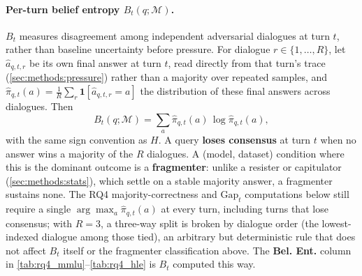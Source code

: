 \paragraph{Per-turn belief entropy $B_t(q;\mathcal{M})$.}
$B_t$ measures disagreement among independent adversarial dialogues at turn $t$, rather than baseline uncertainty before pressure. For dialogue $r \in \{1,\ldots,R\}$, let $\hat{a}_{q,t,r}$ be its own final answer at turn $t$, read directly from that turn's trace (\autoref{sec:methods:pressure}) rather than a majority over repeated samples, and $\hat{\pi}_{q,t}(a) = \tfrac{1}{R}\sum_r \mathbf{1}[\hat a_{q,t,r}=a]$ the distribution of these final answers across dialogues. Then
\[
B_t(q;\mathcal{M}) = \sum_{a} \hat{\pi}_{q,t}(a)\,\log \hat{\pi}_{q,t}(a),
\]
with the same sign convention as $H$. A query \textbf{loses consensus} at turn $t$ when no answer wins a majority of the $R$ dialogues. A (model, dataset) condition where this is the dominant outcome is a \textbf{fragmenter}: unlike a resister or capitulator (\autoref{sec:methods:stats}), which settle on a stable majority answer, a fragmenter sustains none. The RQ4 majority-correctness and $\mathrm{Gap}_t$ computations below still require a single $\arg\max_a \hat\pi_{q,t}(a)$ at every turn, including turns that lose consensus; with $R=3$, a three-way split is broken by dialogue order (the lowest-indexed dialogue among those tied), an arbitrary but deterministic rule that does not affect $B_t$ itself or the fragmenter classification above. The \textbf{Bel. Ent.} column in \autoref{tab:rq4_mmlu}--\autoref{tab:rq4_hle} is $B_t$ computed this way.

